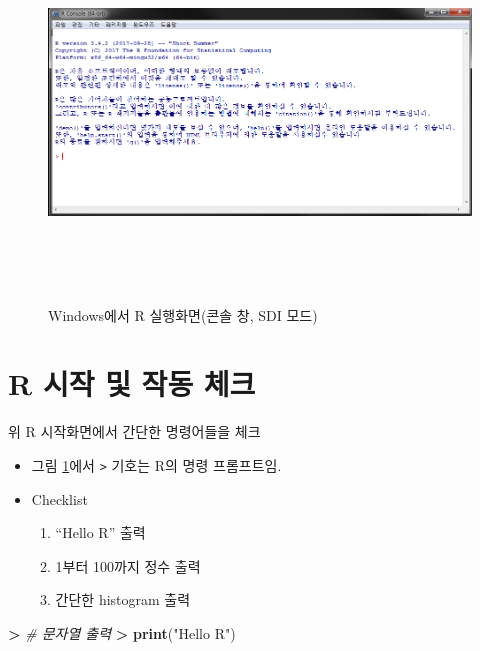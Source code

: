 \documentclass[11pt,a4paper]{book}
\newenvironment{Shaded}{\begin{snugshade}}{\end{snugshade}}
\newcommand{\KeywordTok}[1]{\textcolor[rgb]{0.13,0.29,0.53}{\textbf{#1}}}
\newcommand{\StringTok}[1]{\textcolor[rgb]{0.31,0.60,0.02}{#1}}
\newcommand{\CommentTok}[1]{\textcolor[rgb]{0.56,0.35,0.01}{\textit{#1}}}
\newcommand{\OperatorTok}[1]{\textcolor[rgb]{0.81,0.36,0.00}{\textbf{#1}}}
\newcommand{\ErrorTok}[1]{\textcolor[rgb]{0.64,0.00,0.00}{\textbf{#1}}}
\newcommand{\NormalTok}[1]{#1}
\providecommand{\tightlist}{%
  \setlength{\itemsep}{0pt}\setlength{\parskip}{0pt}}
\theoremstyle{definition}
\theoremstyle{definition}
\theoremstyle{definition}
\theoremstyle{remark}
\begin{document}
\begin{figure}[H]
{
  \centering
  \includegraphics[width = 15cm, height = 10cm]{Figures/Rgui.png}
  \caption[Windows에서 R 실행화면(SDI)]{Windows에서 R 실행화면(콘솔 창, SDI 모드)}\label{fig:R-install-15}
}
\end{figure}

\section{R 시작 및 작동 체크}\label{r----}

위 R 시작화면에서 간단한 명령어들을 체크

\begin{itemize}
\tightlist
\item
  그림 \ref{fig:R-install-15}에서 \texttt{\textgreater{}} 기호는 R의
  명령 프롬프트임.
\item
  Checklist

  \begin{enumerate}
  \def\labelenumi{\arabic{enumi})}
  \tightlist
  \item
    ``Hello R'' 출력
  \item
    1부터 100까지 정수 출력
  \item
    간단한 histogram 출력
  \end{enumerate}
\end{itemize}

\footnotesize

\begin{Shaded}
\begin{Highlighting}[]
\OperatorTok{>}\StringTok{ }\CommentTok{# 문자열 출력}
\ErrorTok{>}\StringTok{ }\KeywordTok{print}\NormalTok{(}\StringTok{"Hello R"}\NormalTok{)}
\end{Highlighting}
\end{Shaded}
\end{document}
